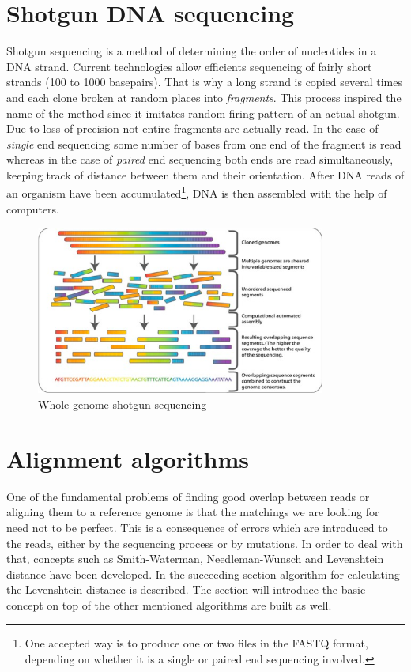 \documentclass[times, utf8, diplomski]{fer}
\begin{document}
\section{Shotgun DNA sequencing}

Shotgun sequencing is a method of determining the order of nucleotides in a DNA strand. Current technologies allow efficients sequencing of fairly short strands (100 to 1000 basepairs). That is why a long strand is copied several times and each clone broken at random places into \emph{fragments}. This process inspired the name of the method since it imitates random firing pattern of an actual shotgun. Due to loss of precision not entire fragments are actually read. In the case of \emph{single} end sequencing some number of bases from one end of the fragment is read whereas in the case of \emph{paired} end sequencing both ends are read simultaneously, keeping track of distance between them and their orientation. After DNA reads of an organism have been accumulated\footnote{One accepted way is to produce one or two files in the FASTQ format, depending on whether it is a single or paired end sequencing involved.}, DNA is then assembled with the help of computers. 

\begin{figure}[!ht]
\begin{center}
	\includegraphics[width=0.85\textwidth]{../img/Whole_genome_shotgun_sequencing.png}
	\caption{Whole genome shotgun sequencing\cite{shotgun.sequencing.img}}\label{shotgun.sequencing}
\end{center}
\end{figure}

\section{Alignment algorithms}

One of the fundamental problems of finding good overlap between reads or aligning them to a reference genome is that the matchings we are looking for need not to be perfect. This is a consequence of errors which are introduced to the reads, either by the sequencing process or by mutations. In order to deal with that, concepts such as Smith-Waterman\cite{Smith1981195}, Needleman-Wunsch\cite{nw}  and Levenshtein distance\cite{edit.distance.tutorial} have been developed. In the succeeding section algorithm for calculating the Levenshtein distance is described. The section will introduce the basic concept on top of the other mentioned algorithms are built as well.
\end{document}
